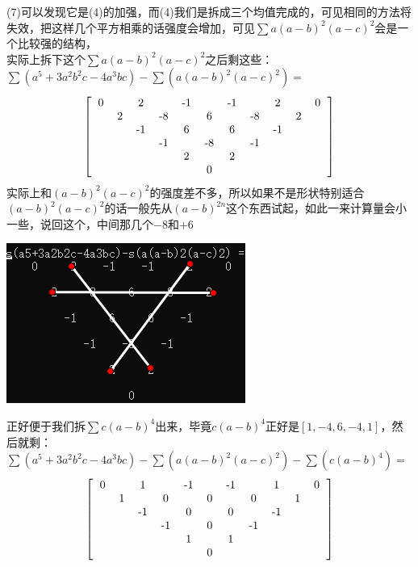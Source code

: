 \documentclass[UTF8]{ctexart}
\begin{document}
(7)可以发现它是(4)的加强，而(4)我们是拆成三个均值完成的，可见相同的方法将失效，把这样几个平方相乘的话强度会增加，可见$\displaystyle \sum a(a-b)^{2}(a-c)^{2}$会是一个比较强的结构，\\
实际上拆下这个$\displaystyle \sum a(a-b)^{2}(a-c)^{2}$之后剩这些：\\
 $\displaystyle \sum (a^{5}+3a^{2}b^{2}c-4a^{3}bc)-\displaystyle \sum (a(a-b)^{2}(a-c)^{2})=$\\
 \renewcommand*{\arraystretch}{1.732}\[\left[\begin{matrix}
 	\begin{tabular}{ccccccccccccc}
 		0& &2& &-1& &-1& &2& &0\\
 		&2& &-8& &6& &-8& &2&\\
 		& &-1& &6& &6& &-1& &\\
 		& & &-1& &-8& &-1& & &\\
 		& & & &2& &2& & & &\\
 		& & & & &0& & & & &\\
 	\end{tabular}
 \end{matrix}\right]\]
实际上和$ (a-b)^{2}(a-c)^{2} $的强度差不多，所以如果不是形状特别适合$ (a-b)^{2}(a-c)^{2} $的话一般先从$ (a-b)^{2n} $这个东西试起，如此一来计算量会小一些，说回这个，中间那几个$-8$和$+6$
  \begin{center}
  	\includegraphics[width=0.4\linewidth]{0170}
  \end{center}
正好便于我们拆$\displaystyle \sum c(a-b)^{4}$出来，毕竟$c(a-b)^{4}$正好是$[1,-4,6,-4,1]$，然后就剩：\\
  $ \displaystyle \sum (a^{5}+3a^{2}b^{2}c-4a^{3}bc)-\displaystyle \sum (a(a-b)^{2}(a-c)^{2})-\displaystyle \sum (c(a-b)^{4}) = $
  \renewcommand*{\arraystretch}{1.732}\[\left[\begin{matrix}
  	\begin{tabular}{ccccccccccccc}
  		0& &1& &-1& &-1& &1& &0\\
  		&1& &0& &0& &0& &1&\\
  		& &-1& &0& &0& &-1& &\\
  		& & &-1& &0& &-1& & &\\
  		& & & &1& &1& & & &\\
  		& & & & &0& & & & &\\
  	\end{tabular}
  \end{matrix}\right]\]
\end{document}
